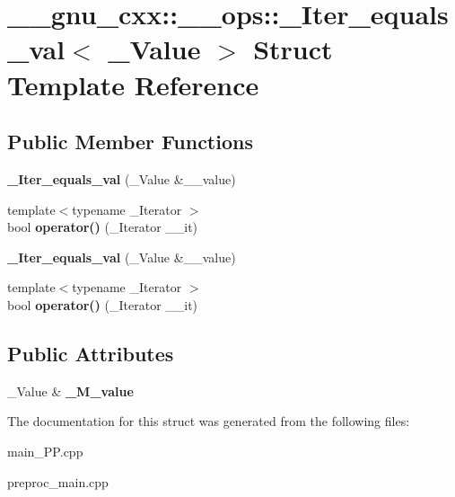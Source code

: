 \hypertarget{struct____gnu__cxx_1_1____ops_1_1__Iter__equals__val}{\section{\+\_\+\+\_\+gnu\+\_\+cxx\+:\+:\+\_\+\+\_\+ops\+:\+:\+\_\+\+Iter\+\_\+equals\+\_\+val$<$ \+\_\+\+Value $>$ Struct Template Reference}
\label{struct____gnu__cxx_1_1____ops_1_1__Iter__equals__val}
}
\subsection*{Public Member Functions}
\begin{DoxyCompactItemize}
\item 
\hypertarget{struct____gnu__cxx_1_1____ops_1_1__Iter__equals__val_a9402719cc09cc91c26ae7a93d93737e8}{{\bfseries \+\_\+\+Iter\+\_\+equals\+\_\+val} (\+\_\+\+Value \&\+\_\+\+\_\+value)}\label{struct____gnu__cxx_1_1____ops_1_1__Iter__equals__val_a9402719cc09cc91c26ae7a93d93737e8}

\item 
\hypertarget{struct____gnu__cxx_1_1____ops_1_1__Iter__equals__val_a2ffd5df15536dd8ded2714078a019ca6}{{\footnotesize template$<$typename \+\_\+\+Iterator $>$ }\\bool {\bfseries operator()} (\+\_\+\+Iterator \+\_\+\+\_\+it)}\label{struct____gnu__cxx_1_1____ops_1_1__Iter__equals__val_a2ffd5df15536dd8ded2714078a019ca6}

\item 
\hypertarget{struct____gnu__cxx_1_1____ops_1_1__Iter__equals__val_a9402719cc09cc91c26ae7a93d93737e8}{{\bfseries \+\_\+\+Iter\+\_\+equals\+\_\+val} (\+\_\+\+Value \&\+\_\+\+\_\+value)}\label{struct____gnu__cxx_1_1____ops_1_1__Iter__equals__val_a9402719cc09cc91c26ae7a93d93737e8}

\item 
\hypertarget{struct____gnu__cxx_1_1____ops_1_1__Iter__equals__val_a2ffd5df15536dd8ded2714078a019ca6}{{\footnotesize template$<$typename \+\_\+\+Iterator $>$ }\\bool {\bfseries operator()} (\+\_\+\+Iterator \+\_\+\+\_\+it)}\label{struct____gnu__cxx_1_1____ops_1_1__Iter__equals__val_a2ffd5df15536dd8ded2714078a019ca6}

\end{DoxyCompactItemize}
\subsection*{Public Attributes}
\begin{DoxyCompactItemize}
\item 
\hypertarget{struct____gnu__cxx_1_1____ops_1_1__Iter__equals__val_a8311fa35773210cfc036869383f5db7a}{\+\_\+\+Value \& {\bfseries \+\_\+\+M\+\_\+value}}\label{struct____gnu__cxx_1_1____ops_1_1__Iter__equals__val_a8311fa35773210cfc036869383f5db7a}

\end{DoxyCompactItemize}


The documentation for this struct was generated from the following files\+:\begin{DoxyCompactItemize}
\item 
main\+\_\+\+P\+P.\+cpp\item 
preproc\+\_\+main.\+cpp\end{DoxyCompactItemize}
